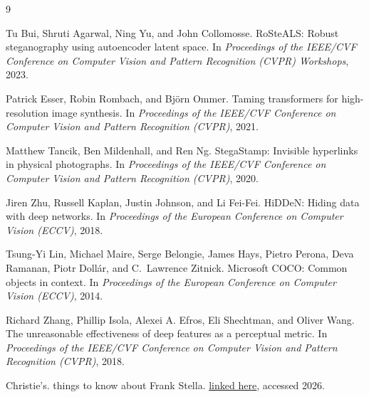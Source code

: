 \documentclass[twocolumn]{article}
\begin{document}
\begin{thebibliography}{9}

Tu Bui, Shruti Agarwal, Ning Yu, and John Collomosse.
\newblock RoSteALS: Robust steganography using autoencoder latent space.
\newblock In \textit{Proceedings of the IEEE/CVF Conference on Computer Vision and Pattern Recognition (CVPR) Workshops}, 2023.

Patrick Esser, Robin Rombach, and Bj\"orn Ommer.
\newblock Taming transformers for high-resolution image synthesis.
\newblock In \textit{Proceedings of the IEEE/CVF Conference on Computer Vision and Pattern Recognition (CVPR)}, 2021.

Matthew Tancik, Ben Mildenhall, and Ren Ng.
\newblock StegaStamp: Invisible hyperlinks in physical photographs.
\newblock In \textit{Proceedings of the IEEE/CVF Conference on Computer Vision and Pattern Recognition (CVPR)}, 2020.

Jiren Zhu, Russell Kaplan, Justin Johnson, and Li Fei-Fei.
\newblock HiDDeN: Hiding data with deep networks.
\newblock In \textit{Proceedings of the European Conference on Computer Vision (ECCV)}, 2018.

Tsung-Yi Lin, Michael Maire, Serge Belongie, James Hays, Pietro Perona, Deva Ramanan, Piotr Doll\'ar, and C.~Lawrence Zitnick.
\newblock Microsoft COCO: Common objects in context.
\newblock In \textit{Proceedings of the European Conference on Computer Vision (ECCV)}, 2014.

Richard Zhang, Phillip Isola, Alexei A. Efros, Eli Shechtman, and Oliver Wang.
\newblock The unreasonable effectiveness of deep features as a perceptual metric.
\newblock In \textit{Proceedings of the IEEE/CVF Conference on Computer Vision and Pattern Recognition (CVPR)}, 2018.

Christie's.
 things to know about Frank Stella.
\newblock \href{https://www.christies.com/en/stories/15-things-to-know-about-frank-stella-cdb2d362bac44f7fb7567e26ac2e201e}{\underline{linked here}}, accessed 2026.

\end{thebibliography}
\end{document}
